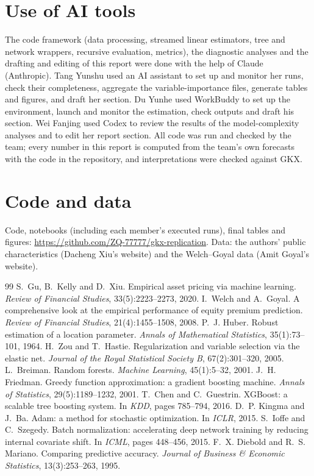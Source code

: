 \documentclass[10pt]{article}
\begin{document}
\section*{Use of AI tools}
\small
The code framework (data processing, streamed linear estimators, tree and network wrappers, recursive evaluation, metrics),
the diagnostic analyses and the drafting and editing of this report were done with the help of Claude (Anthropic). Tang
Yunshu used an AI assistant to set up and monitor her runs, check their completeness, aggregate the variable-importance
files, generate tables and figures, and draft her section.
Du Yunhe used WorkBuddy to set up the environment, launch and monitor the estimation, check outputs and draft his section.
Wei Fanjing used Codex to review the results of the model-complexity analyses and to edit her report section. All code was run and checked by the team; every number in this
report is computed from the team's own forecasts with the code in the repository, and interpretations were checked against
GKX.

\section*{Code and data}
\small
Code, notebooks (including each member's executed runs), final tables and figures:
\url{https://github.com/ZQ-77777/gkx-replication}. Data: the authors' public characteristics (Dacheng Xiu's website) and
the Welch--Goyal data (Amit Goyal's website).

\begin{thebibliography}{99}\small
{} S.~Gu, B.~Kelly and D.~Xiu. Empirical asset pricing via machine learning. \emph{Review of Financial Studies}, 33(5):2223--2273, 2020.
 I.~Welch and A.~Goyal. A comprehensive look at the empirical performance of equity premium prediction. \emph{Review of Financial Studies}, 21(4):1455--1508, 2008.
 P.~J. Huber. Robust estimation of a location parameter. \emph{Annals of Mathematical Statistics}, 35(1):73--101, 1964.
 H.~Zou and T.~Hastie. Regularization and variable selection via the elastic net. \emph{Journal of the Royal Statistical Society B}, 67(2):301--320, 2005.
 L.~Breiman. Random forests. \emph{Machine Learning}, 45(1):5--32, 2001.
 J.~H. Friedman. Greedy function approximation: a gradient boosting machine. \emph{Annals of Statistics}, 29(5):1189--1232, 2001.
 T.~Chen and C.~Guestrin. XGBoost: a scalable tree boosting system. In \emph{KDD}, pages 785--794, 2016.
 D.~P. Kingma and J.~Ba. Adam: a method for stochastic optimization. In \emph{ICLR}, 2015.
 S.~Ioffe and C.~Szegedy. Batch normalization: accelerating deep network training by reducing internal covariate shift. In \emph{ICML}, pages 448--456, 2015.
 F.~X. Diebold and R.~S. Mariano. Comparing predictive accuracy. \emph{Journal of Business \& Economic Statistics}, 13(3):253--263, 1995.
\end{thebibliography}
\end{document}
